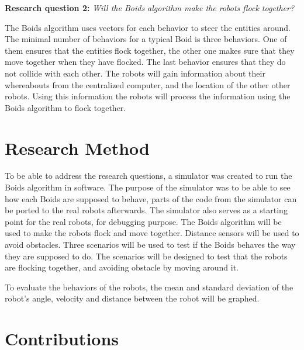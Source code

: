 \textbf{Research question 2:} {\it Will the Boids algorithm make the robots flock together?}

The Boids algorithm uses vectors for each behavior to steer the entities around. The minimal number of behaviors for a typical Boid is three behaviors. One of them ensures that the entities flock together, the other one makes sure that they move together when they have flocked. The last behavior ensures that they do not collide with each other. The robots will gain information about their whereabouts from the centralized computer, and the location of the other other robots. Using this information the robots will process the information using the Boids algorithm to flock together.


\section{Research Method}
\label{sec:researchMethod}
To be able to address the research questions, a simulator was created to run the Boids algorithm in software. The purpose of the simulator was to be able to see how each Boids are supposed to behave, parts of the code from the simulator can be ported to the real robots afterwards. The simulator also serves as a starting point for the real robots, for debugging purpose.
The Boids algorithm will be used to make the robots flock and move together. Distance sensors will be used to avoid obstacles.
Three scenarios will be used to test if the Boids behaves the way they are supposed to do. The scenarios will be designed to test that the robots are flocking together, and avoiding obstacle by moving around it.

To evaluate the behaviors of the robots, the mean and standard deviation of the robot's angle, velocity and distance between the robot will be graphed. 

\section{Contributions}
\label{sec:IntroContributions}


